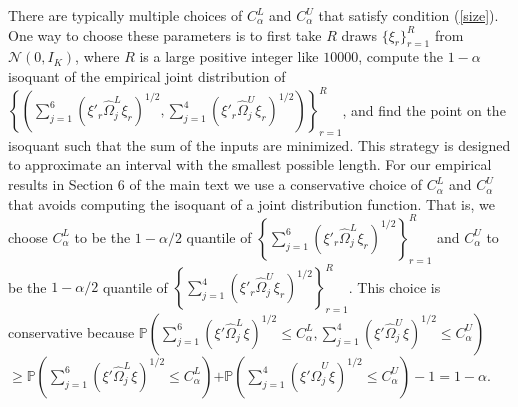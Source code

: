\documentclass[12pt]{article}
\theoremstyle{definition}
\begin{document}
{There are typically multiple choices of $C_{\alpha}^{L}$ and $C_{\alpha}^{U}$ that satisfy condition (\ref{size}). One way to choose these parameters is to first take $R$ draws $\{\xi_{r}\}_{r=1}^{R}$ from $\mathcal{N}\left(0,I_{K}\right)$, where $R$ is a large positive integer like $10000$, compute the $1-\alpha$ isoquant of the empirical joint distribution of $\left\{\left(\sum_{j=1}^{6}\left(\xi'_{r} \hat{\Omega}_j^{L} \xi_{r}\right)^{1/2},\sum_{j=1}^{4}\left(\xi '_{r} \hat{\Omega}_j^{U} \xi_{r}\right)^{1/2}\right)\right\}_{r=1}^{R}$, and find the point on the isoquant such that the sum of the inputs are minimized. This strategy is designed to approximate an interval with the smallest possible length. For our empirical results in Section 6 of the main text we use a conservative choice of $C_{\alpha}^{L}$ and $C_{\alpha}^{U}$ that avoids computing the isoquant of a joint distribution function.  That is, we choose $C_{\alpha}^{L}$ to be the $1-\alpha/2$ quantile of  $\left\{\sum_{j=1}^{6}\left(\xi'_{r} \hat{\Omega}_j^{L} \xi_{r}\right)^{1/2}\right\}_{r=1}^{R}$ and $C_{\alpha}^{U}$ to be the $1 - \alpha/2$ quantile of $\left\{\sum_{j=1}^{4}\left(\xi'_{r} \hat{\Omega}_j^{U} \xi_{r}\right)^{1/2}\right\}_{r=1}^{R}$. This choice is conservative because $\mathbb{P}\left(\sum_{j=1}^{6}\left(\xi ' \hat{\Omega}_j^{L} \xi\right)^{1/2} \leq C_{\alpha}^{L},\sum_{j=1}^{4}\left(\xi ' \hat{\Omega}_j^{U} \xi\right)^{1/2} \leq C_{\alpha}^{U} \right) $
$\geq \mathbb{P}\left(\sum_{j=1}^{6}\left(\xi ' \hat{\Omega}_j^{L} \xi\right)^{1/2} \leq C_{\alpha}^{L}\right) $$+ \mathbb{P}\left(\sum_{j=1}^{4}\left(\xi ' \hat{\Omega}_j^{U} \xi\right)^{1/2} \leq C_{\alpha}^{U} \right) - 1 = 1- \alpha.$  

}
\end{document}
